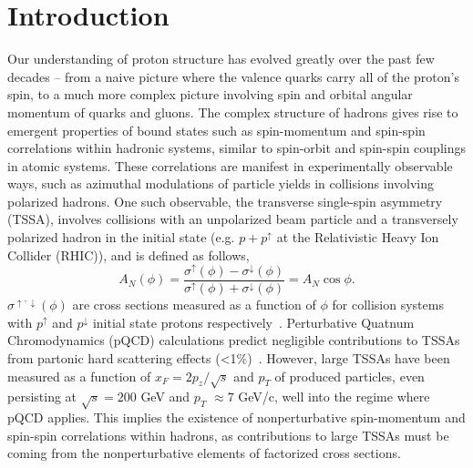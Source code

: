 \documentclass[submission, Proceedings]{SciPost}
\begin{document}
\section{Introduction}
\label{sec:intro}
Our understanding of proton structure has evolved greatly over the past few decades --  from a naive picture where the valence quarks carry all of the proton's spin, to a much more complex picture involving spin and orbital angular momentum of quarks and gluons. The complex structure of hadrons gives rise to emergent properties of bound states such as spin-momentum and spin-spin correlations within hadronic systems, similar to spin-orbit and spin-spin couplings in atomic systems. These correlations are manifest in experimentally observable ways, such as azimuthal modulations of particle yields in collisions involving polarized hadrons. One such observable, the transverse single-spin asymmetry (TSSA), involves collisions with an unpolarized beam particle and a transversely polarized hadron in the initial state (e.g. $p+p^{\uparrow}$ at the Relativistic Heavy Ion Collider (RHIC)), and is defined as follows, 
\begin{equation}
A_{N} (\phi) = \frac{\sigma^{\uparrow}(\phi) - \sigma^{\downarrow} (\phi)}{\sigma^{\uparrow}(\phi) + \sigma^{\downarrow} (\phi)} = A_{N} \cos\phi.
\end{equation}\label{eqn:AN_phi}
$\sigma^{\uparrow,\downarrow}(\phi)$ are cross sections measured as a function of $\phi$ for collision systems with $p^{\uparrow}$ and $p^{\downarrow}$ initial state protons respectively~\cite{muons}. Perturbative Quatnum Chromodynamics (pQCD) calculations predict negligible contributions to TSSAs from partonic hard scattering effects (<1\%)~\cite{kane}. However, large TSSAs have been measured as a function of $x_{F} = 2p_{z}/\sqrt{s}$ and $p_{T}$ of produced particles, even persisting at $\sqrt{s} = 200$ GeV and $p_{T}$ $\approx 7$ GeV/c, well into the regime where pQCD applies\cite{largeTSSA,KIT}. This implies the existence of nonperturbative spin-momentum and spin-spin correlations within hadrons, as contributions to large TSSAs must be coming from the nonperturbative elements of factorized cross sections. 
\end{document}
